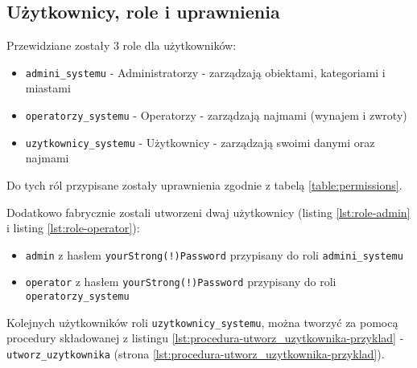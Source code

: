 \subsection{Użytkownicy, role i uprawnienia}

Przewidziane zostały 3 role dla użytkowników:
\begin{itemize}
	\item \texttt{admini\_systemu} - Administratorzy - zarządzają obiektami, kategoriami i miastami
	\item \texttt{operatorzy\_systemu} - Operatorzy - zarządzają najmami (wynajem i zwroty)
	\item \texttt{uzytkownicy\_systemu} - Użytkownicy - zarządzają swoimi danymi oraz najmami
\end{itemize}
Do tych ról przypisane zostały uprawnienia zgodnie z tabelą \ref{table:permissions}.

Dodatkowo fabrycznie zostali utworzeni dwaj użytkownicy (listing \ref{lst:role-admin} i listing \ref{lst:role-operator}):
\begin{itemize}
	\item \texttt{admin} z hasłem \texttt{yourStrong(!)Password} przypisany do roli \texttt{admini\_systemu}
	\item \texttt{operator} z hasłem \texttt{yourStrong(!)Password} przypisany do roli \texttt{operatorzy\_systemu}
\end{itemize}

Kolejnych użytkowników roli \texttt{uzytkownicy\_systemu}, można tworzyć za pomocą procedury składowanej z listingu \ref{lst:procedura-utworz_uzytkownika-przyklad} - \texttt{utworz\_uzytkownika} (strona \ref{lst:procedura-utworz_uzytkownika-przyklad}).

